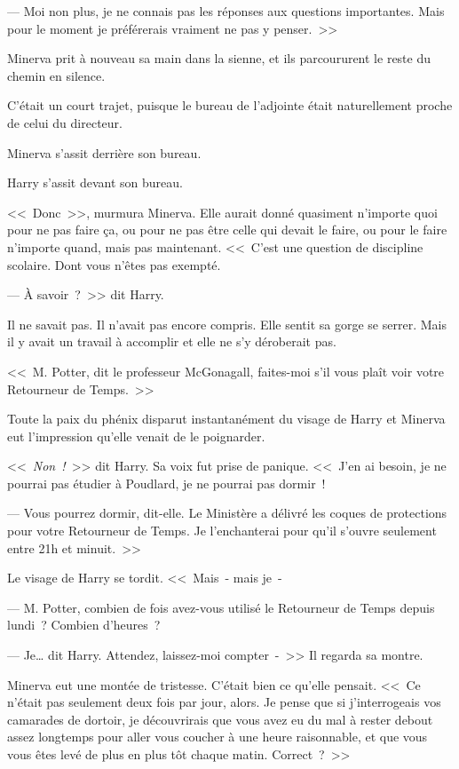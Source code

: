 --- Moi non plus, je ne connais pas les réponses aux questions importantes. Mais pour le moment je préférerais vraiment ne pas y penser.~>>

Minerva prit à nouveau sa main dans la sienne, et ils parcoururent le reste du chemin en silence.

C'était un court trajet, puisque le bureau de l'adjointe était naturellement proche de celui du directeur.

Minerva s'assit derrière son bureau.

Harry s'assit devant son bureau.

<<~Donc~>>, murmura Minerva. Elle aurait donné quasiment n'importe quoi pour ne pas faire ça, ou pour ne pas être celle qui devait le faire, ou pour le faire n'importe quand, mais pas maintenant. <<~C'est une question de discipline scolaire. Dont vous n'êtes pas exempté.

--- À savoir~?~>> dit Harry.

Il ne savait pas. Il n'avait pas encore compris. Elle sentit sa gorge se serrer. Mais il y avait un travail à accomplir et elle ne s'y déroberait pas.

<<~M. Potter, dit le professeur McGonagall, faites-moi s'il vous plaît voir votre Retourneur de Temps.~>>

Toute la paix du phénix disparut instantanément du visage de Harry et Minerva eut l'impression qu'elle venait de le poignarder.

<<~\emph{Non~!}~>> dit Harry. Sa voix fut prise de panique. <<~J'en ai besoin, je ne pourrai pas étudier à Poudlard, je ne pourrai pas dormir~!

--- Vous pourrez dormir, dit-elle. Le Ministère a délivré les coques de protections pour votre Retourneur de Temps. Je l'enchanterai pour qu'il s'ouvre seulement entre 21h et minuit.~>>

Le visage de Harry se tordit. <<~Mais~- mais je~-

--- M. Potter, combien de fois avez-vous utilisé le Retourneur de Temps depuis lundi~? Combien d'heures~?

--- Je… dit Harry. Attendez, laissez-moi compter~-~>> Il regarda sa montre.

Minerva eut une montée de tristesse. C'était bien ce qu'elle pensait. <<~Ce n'était pas seulement deux fois par jour, alors. Je pense que si j'interrogeais vos camarades de dortoir, je découvrirais que vous avez eu du mal à rester debout assez longtemps pour aller vous coucher à une heure raisonnable, et que vous vous êtes levé de plus en plus tôt chaque matin. Correct~?~>>

